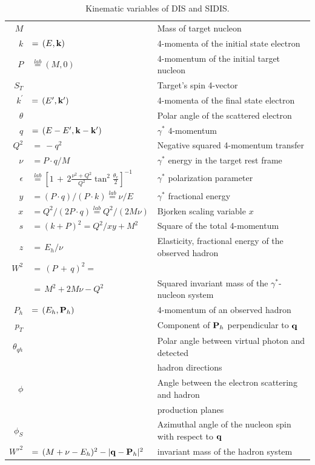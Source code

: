 \begin{table}[htb]
\begin{center}
\begin{tabular}{|rll|}
\hline
$M$ & & Mass of target nucleon \\
$k$ & $ =\, (E,{\bf k}) $ & 4-momenta of the initial state electron \\
$P$ & $ \stackrel{lab}{=} (M, 0)$ & 4-momentum of the initial target nucleon \\
$S_T$ & & Target's spin 4-vector \\
\hline
$k^\prime$ & $ =\, (E^\prime, {\bf k^\prime})$ & 4-momenta of the final state electron \\
$\theta$ & & Polar angle of the scattered electron \\
$q $   & $ =\, (E-E^\prime, {\bf k-k^\prime})$ & $\gamma^*$ 4-momentum  \\
$Q^2 $ & $ =\, -q^2$ & Negative squared 4-momentum transfer \\
$\nu $ & $ = {P \cdot q}/{M}$ & $\gamma^*$ energy in the target rest frame \\ 
$\epsilon $ & $ \stackrel{lab}{=}\left[ 1 \,+\, 2 \frac{\nu^2+Q^2}{Q^2} \tan^2 \frac{\theta_e}{2} \right]^{-1}$ &
       $\gamma^*$ polarization parameter \\
$y $   & $ = (P \cdot q)/(P \cdot k) \stackrel{lab}{=} \nu/E$ & $\gamma^*$ fractional energy \\
$x $   & $ = Q^2/(2 P \cdot q) \stackrel{lab}{=} Q^2/(2 M\nu)$ & Bjorken scaling variable $x$ \\
$s $   & $ = (k +P)^2 = Q^2/xy +M^2$ & Square of the total 4-momentum \\
$z $   & $ =\, {E_h}/{\nu}$ & Elasticity, fractional energy of the observed hadron\\
$W^2 $ & $ =\, (P \,+\, q)^2 =$ & \\
       & $ =\, M^2 + 2M\nu -Q^2$ & Squared invariant mass of the $\gamma^*$-nucleon system \\
$P_h $ & $ =\, (E_h, {\bf P}_h)$ & 4-momentum of an observed hadron\\
$p_T$ & & Component of ${\bf P}_h$ perpendicular to ${\bf q}$  \\
$\theta_{qh}$ & & Polar angle between virtual photon and detected \\
& & hadron directions\\
$\phi$ & & Angle between the electron scattering and hadron \\ 
& & production planes \\
$\phi_{S}$ & & Azimuthal angle of the nucleon spin with respect to ${\bf q}$ \\ 
$W'^2 $ & $ = \, (M + \nu - E_h)^2 - | {\bf q} - {\bf P}_h | ^2$ & invariant mass of the hadron system \\
\hline
\end{tabular}
\end{center} 
\caption[]{Kinematic variables of DIS and SIDIS.}
\label{tab:variables}
\end{table}

